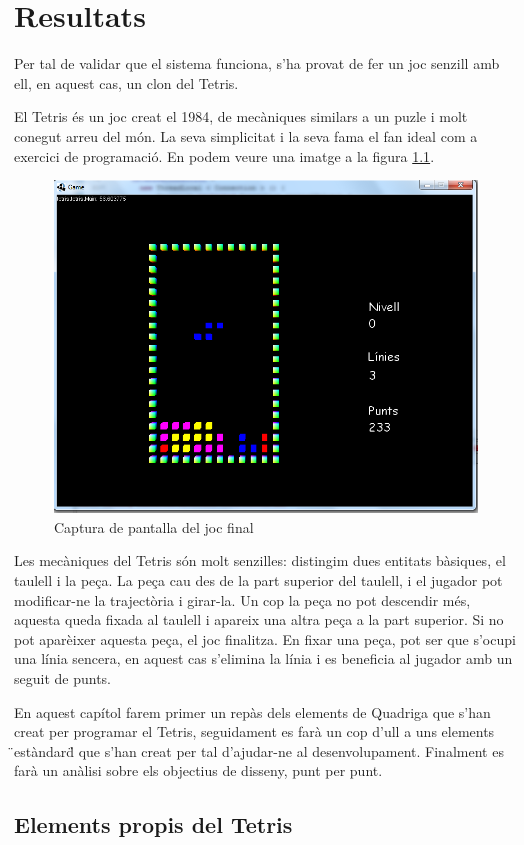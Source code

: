 \chapter{Resultats}
\label{chap:Resultats}

  Per tal de validar que el sistema funciona, s'ha provat de fer un joc senzill amb ell, en aquest cas, un clon del Tetris.
  
  El Tetris és un joc creat el 1984, de mecàniques similars a un puzle i molt conegut arreu del món. La seva simplicitat i la seva fama el fan ideal com a exercici de programació. En podem veure una imatge a la figura \ref{fig:ImatgeTetris}.
  
  \begin{figure}
    \centering
    \includegraphics[width=0.5\linewidth]{./img/ImatgeTetris.png}
    \caption{Captura de pantalla del joc final \label{fig:ImatgeTetris}}
  \end{figure}
  
  Les mecàniques del Tetris són molt senzilles: distingim dues entitats bàsiques, el taulell i la peça. La peça cau des de la part superior del taulell, i el jugador pot modificar-ne la trajectòria i girar-la. Un cop la peça no pot descendir més, aquesta queda fixada al taulell i apareix una altra peça a la part superior. Si no pot aparèixer aquesta peça, el joc finalitza. En fixar una peça, pot ser que s'ocupi una línia sencera, en aquest cas s'elimina la línia i es beneficia al jugador amb un seguit de punts.

  En aquest capítol farem primer un repàs dels elements de Quadriga que s'han creat per programar el Tetris, seguidament es farà un cop d'ull a uns elements \"{}estàndard\"{} que s'han creat per tal d'ajudar-ne al desenvolupament. Finalment es farà un anàlisi sobre els objectius de disseny, punt per punt.
  
  \section{Elements propis del Tetris}

